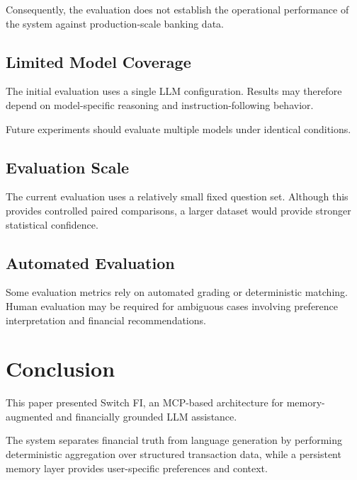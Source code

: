 \documentclass[conference]{IEEEtran}
\begin{document}
    Consequently, the evaluation does not establish the operational
    performance of the system against production-scale banking data.
    
    \subsection{Limited Model Coverage}
    
    The initial evaluation uses a single LLM configuration. Results may
    therefore depend on model-specific reasoning and instruction-following
    behavior.
    
    Future experiments should evaluate multiple models under identical
    conditions.
    
    \subsection{Evaluation Scale}
    
    The current evaluation uses a relatively small fixed question set.
    Although this provides controlled paired comparisons, a larger dataset
    would provide stronger statistical confidence.
    
    \subsection{Automated Evaluation}
    
    Some evaluation metrics rely on automated grading or deterministic
    matching. Human evaluation may be required for ambiguous cases involving
    preference interpretation and financial recommendations.
    
    
    \section{Conclusion}
    
    This paper presented Switch FI, an MCP-based architecture for
    memory-augmented and financially grounded LLM assistance.
    
    The system separates financial truth from language generation by
    performing deterministic aggregation over structured transaction data,
    while a persistent memory layer provides user-specific preferences and
    context.
    
\end{document}
